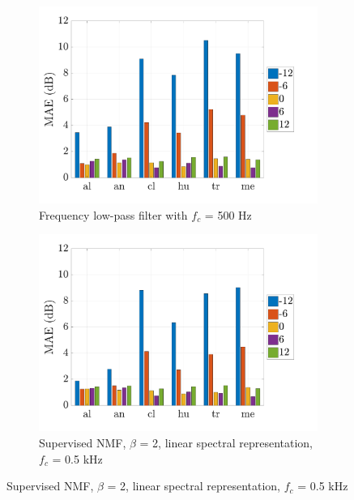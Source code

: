 \documentclass[twocolumn,a4paper,10pt]{article}
\begin{document}
\begin{figure}
    \centering
    \begin{subfigure}[t]{0.45\textwidth}
        \centering
        \includegraphics[width=\linewidth]{figures/filter_bar.pdf}
        \caption{Frequency low-pass filter with $f_c$ = 500 Hz}
        \label{fig:TIR_class_filter}
    \end{subfigure}%
    \hfill
    \begin{subfigure}[t]{0.45\textwidth}
        \centering
        \includegraphics[width=\linewidth]{figures/sup_bar.pdf}
        \caption{Supervised NMF, $\beta$ = 2, linear spectral representation, $f_c$ = 0.5 kHz}
                \label{fig:TIR_class_sup}
    \end{subfigure}


\end{figure}
\end{document}
